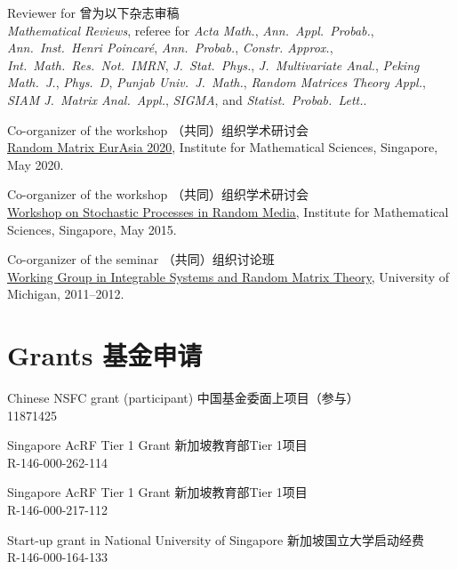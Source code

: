 \documentclass[12pt,a4paper]{article}
\newenvironment{item_list}{
 \begin{list}{}{
   \setlength{\leftmargin}{1.5em}
   \setlength{\itemsep}{0.25em}
   \setlength{\parskip}{0pt}
   \setlength{\parsep}{0.25em}
 }
}{
 \end{list}
}
\begin{document}
\begin{item_list}
\item Reviewer for 曾为以下杂志审稿 \\
  \textit{Mathematical Reviews}, referee for \textit{Acta Math.}, \textit{Ann.\ Appl.\ Probab.}, \textit{Ann.\ Inst.\ Henri Poincar\'{e}}, \textit{Ann.\ Probab.}, \textit{Constr. Approx.}, \textit{Int.\ Math.\ Res.\ Not.\ IMRN}, \textit{J.\ Stat.\ Phys.}, \textit{J.\ Multivariate Anal.}, \textit{Peking Math.\ J.}, \textit{Phys.\ D}, \textit{Punjab Univ.\ J.\ Math.}, \textit{Random Matrices Theory Appl.}, \textit{SIAM J.\ Matrix Anal.\ Appl.}, \textit{SIGMA}, and \textit{Statist.\ Probab.\ Lett.}.
\item Co-organizer of the workshop （共同）组织学术研讨会 \\
  \href{https://ims.nus.edu.sg/events/2020/random/index.php}{Random Matrix EurAsia 2020}, Institute for Mathematical Sciences, Singapore, May 2020.
\item Co-organizer of the workshop （共同）组织学术研讨会 \\
  \href{http://www2.ims.nus.edu.sg/Programs/015wrandom/index.php}{Workshop on Stochastic Processes in Random Media}, Institute for Mathematical Sciences, Singapore, May 2015.
\item Co-organizer of the seminar （共同）组织讨论班 \\
  \href{http://www.math.lsa.umich.edu/seminars_events/events.php?eventdefid=43&dt_begin=2011-07-01&dt_end=2011-12-31}
  {Working Group in Integrable Systems and Random Matrix Theory}, University of Michigan, 2011--2012.
\end{item_list}

\section*{Grants 基金申请}

\begin{item_list}
\item 
  Chinese NSFC grant (participant) 中国基金委面上项目（参与）\\
  11871425
\item
  Singapore AcRF Tier 1 Grant 新加坡教育部Tier 1项目 \\
  R-146-000-262-114
\item
  Singapore AcRF Tier 1 Grant 新加坡教育部Tier 1项目 \\
  R-146-000-217-112
\item
  Start-up grant in National University of Singapore 新加坡国立大学启动经费 \\
  R-146-000-164-133
  
\end{item_list}
\end{document}
